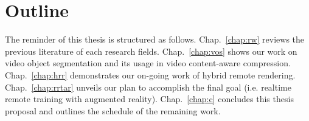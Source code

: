 \section{Outline}

The reminder of this thesis is structured as follows. Chap.~\ref{chap:rw} reviews the previous literature of each research fields. Chap.~\ref{chap:vos} shows our work on video object segmentation and its usage in video content-aware compression. Chap.~\ref{chap:hrr} demonstrates our on-going work of hybrid remote rendering. Chap.~\ref{chap:rrtar} unveils our plan to accomplish the final goal (i.e. realtime remote training with augmented reality). Chap.~\ref{chap:c} concludes this thesis proposal and outlines the schedule of the remaining work.
